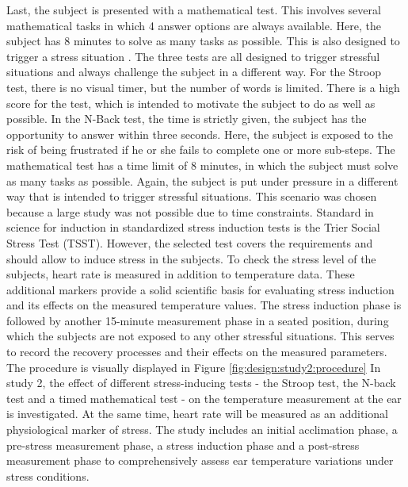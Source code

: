 Last, the subject is presented with a mathematical test. 
This involves several mathematical tasks in which 4 answer options are always available.
Here, the subject has 8 minutes to solve as many tasks as possible. 
This is also designed to trigger a stress situation \cite{caviolaStressTimePressure2017}.
The three tests are all designed to trigger stressful situations and always challenge the subject in a different way.
For the Stroop test, there is no visual timer, but the number of words is limited. 
There is a high score for the test, which is intended to motivate the subject to do as well as possible. 
In the N-Back test, the time is strictly given, the subject has the opportunity to answer within three seconds.
Here, the subject is exposed to the risk of being frustrated if he or she fails to complete one or more sub-steps.
The mathematical test has a time limit of 8 minutes, in which the subject must solve as many tasks as possible.
Again, the subject is put under pressure in a different way that is intended to trigger stressful situations.
This scenario was chosen because a large study was not possible due to time constraints. 
Standard in science for induction in standardized stress induction tests is the Trier Social Stress Test (TSST). 
However, the selected test covers the requirements and should allow to induce stress in the subjects.
To check the stress level of the subjects, heart rate is measured in addition to temperature data. 
These additional markers provide a solid scientific basis for evaluating stress induction and its effects on the measured temperature values.
The stress induction phase is followed by another 15-minute measurement phase in a seated position, during which the subjects are not exposed to any other stressful situations. 
This serves to record the recovery processes and their effects on the measured parameters. 
The procedure is visually displayed in Figure \ref{fig:design:study2:procedure}
In study 2, the effect of different stress-inducing tests - the Stroop test, the N-back test and a timed mathematical test - on the temperature measurement at the ear is investigated.
At the same time, heart rate will be measured as an additional physiological marker of stress. 
The study includes an initial acclimation phase, a pre-stress measurement phase, a stress induction phase and a post-stress measurement phase to comprehensively assess ear temperature variations under stress conditions.